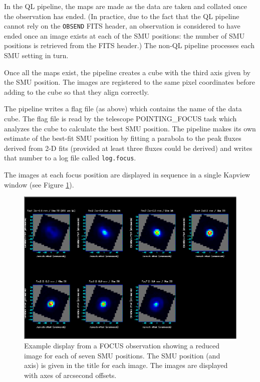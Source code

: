 \documentclass[twoside,11pt,nolof]{starlink}
\begin{document}
In the QL pipeline, the maps are made as the data are taken and
collated once the observation has ended. (In practice, due to the fact
that the QL pipeline cannot rely on the \verb+OBSEND+ FITS header, an
observation is considered to have ended once an image exists at each
of the SMU positions: the number of SMU positions is retrieved from
the FITS header.) The non-QL pipeline processes each SMU setting in
turn.

Once all the maps exist, the pipeline creates a cube with the third
axis given by the SMU position. The images are registered to the same
pixel coordinates before adding to the cube so that they align
correctly.

The pipeline writes a flag file (as above) which contains the name of
the data cube. The flag file is read by the telescope POINTING\_FOCUS
task which analyzes the cube to calculate the best SMU position. The
pipeline makes its own estimate of the best-fit SMU position by
fitting a parabola to the peak fluxes derived from 2-D fits (provided
at least three fluxes could be derived) and writes that number to a
log file called \verb+log.focus+.

The images at each focus position are displayed in sequence in a
single Kapview window (see Figure \ref{fig:focus}).

\begin{figure}[t]
\centering
\includegraphics[width=\textwidth]{sun264_focus}
\caption{Example display from a FOCUS observation showing a reduced
  image for each of seven SMU positions. The SMU position (and axis)
  is given in the title for each image. The images are displayed with
  axes of arcsecond offsets.\label{fig:focus}}
\end{figure}
\end{document}
